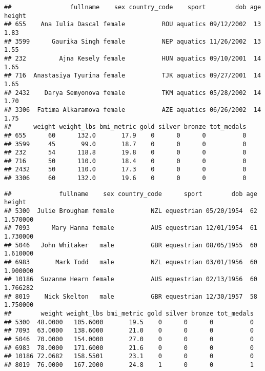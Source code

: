 \documentclass[]{article}
\newenvironment{Shaded}{\begin{snugshade}}{\end{snugshade}}
\newcommand{\KeywordTok}[1]{\textcolor[rgb]{0.13,0.29,0.53}{\textbf{#1}}}
\newcommand{\NormalTok}[1]{#1}
\newcommand{\OperatorTok}[1]{\textcolor[rgb]{0.81,0.36,0.00}{\textbf{#1}}}
\begin{document}
\begin{verbatim}
##                fullname    sex country_code    sport        dob age height
## 655    Ana Iulia Dascal female          ROU aquatics 09/12/2002  13   1.83
## 3599      Gaurika Singh female          NEP aquatics 11/26/2002  13   1.55
## 232         Ajna Kesely female          HUN aquatics 09/10/2001  14   1.65
## 716  Anastasiya Tyurina female          TJK aquatics 09/27/2001  14   1.65
## 2432    Darya Semyonova female          TKM aquatics 05/28/2002  14   1.70
## 3306  Fatima Alkaramova female          AZE aquatics 06/26/2002  14   1.75
##      weight weight_lbs bmi_metric gold silver bronze tot_medals
## 655      60      132.0       17.9    0      0      0          0
## 3599     45       99.0       18.7    0      0      0          0
## 232      54      118.8       19.8    0      0      0          0
## 716      50      110.0       18.4    0      0      0          0
## 2432     50      110.0       17.3    0      0      0          0
## 3306     60      132.0       19.6    0      0      0          0
\end{verbatim}

\begin{Shaded}
\end{Shaded}

\begin{verbatim}
##             fullname    sex country_code      sport        dob age   height
## 5300  Julie Brougham female          NZL equestrian 05/20/1954  62 1.570000
## 7093      Mary Hanna female          AUS equestrian 12/01/1954  61 1.730000
## 5046   John Whitaker   male          GBR equestrian 08/05/1955  60 1.610000
## 6983       Mark Todd   male          NZL equestrian 03/01/1956  60 1.900000
## 10186  Suzanne Hearn female          AUS equestrian 02/13/1956  60 1.766282
## 8019    Nick Skelton   male          GBR equestrian 12/30/1957  58 1.750000
##        weight weight_lbs bmi_metric gold silver bronze tot_medals
## 5300  48.0000   105.6000       19.5    0      0      0          0
## 7093  63.0000   138.6000       21.0    0      0      0          0
## 5046  70.0000   154.0000       27.0    0      0      0          0
## 6983  78.0000   171.6000       21.6    0      0      0          0
## 10186 72.0682   158.5501       23.1    0      0      0          0
## 8019  76.0000   167.2000       24.8    1      0      0          1
\end{verbatim}
\end{document}
